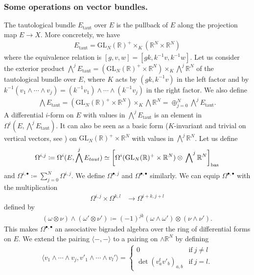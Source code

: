 \documentclass[a4paper,11pt]{amsart} %
\newcommand{\8}{\infty}
\newcommand{\bas}{\mathrm{bas}}
\newcommand{\GL}{\mathrm{GL}}
\newcommand{\R}{\mathbb{R}}
\newcommand{\taut}{\textrm{taut}}
\theoremstyle{mytheoremstyle}
\theoremstyle{remark}
\numberwithin{equation}{section}
\begin{document}
\subsubsection{Some operations on vector bundles.} The tautological bundle $E_ {\taut}$ over $E$ is the pullback of $E$ along the projection map $E \rightarrow X$. More concretely, we have 
\begin{align}
E_ {\taut}=\GL_N(\R)^+ \times_K (\R^{N} \times \R^{N})
\end{align} where the equivalence relation is $[g,v,w]=[gk,k^{-1}v,k^{-1}w]$. Let us consider the exterior product $\bigwedge^jE_{\taut}=(\GL_N(\R)^+ \times \R^{N}) \times_K \bigwedge^j \R^{N}$ of the tautological bundle over $E$, where $K$ acts by $(gk,k^{-1}v)$ in the left factor and by $k^{-1}(v_1 \wedge \cdots \wedge v_j)=(k^{-1}v_1) \wedge \cdots \wedge (k^{-1}v_j)$ in the right factor. We also define 
\begin{align}
\bigwedge E_{\taut}=(\GL_N(\R)^+ \times \R^{N}) \times_K \bigwedge \R^{N} = \oplus_{j=0}^N \bigwedge^jE_{\taut}.
\end{align} A differential $i$-form on $E$ with values in  $\bigwedge^j E_{\taut}$ is an element in $\Omega^i(E,\bigwedge^j E_{\taut})$. It can also be seen as  a basic form ($K$-invariant and trivial on vertical vectors, see \cite[Proposition~1.9]{berline}) on $\GL_N(\R)^+ \times \R^{N}$ with values in $\bigwedge^j \R^N$. 
Let us define
\begin{align}
    \Omega^{i,j} \coloneqq\Omega^i(E,\bigwedge^j E_{\taut}) \simeq \left [ \Omega^i(\GL_N(\R)^+ \times \R^{N}) \otimes  \sideset{}{^{j}}\bigwedge \R^{N} \right ]_{\bas}
\end{align}
and $\Omega^{i,\bullet} \coloneqq \sum_{j=0}^N \Omega^{i,j}$. We define $\Omega^{\bullet,j}$ and $\Omega^{\bullet,\bullet}$ similarly. We can equip $\Omega^{\bullet,\bullet}$ with the multiplication
\begin{align}
   \Omega^{i,j} \times \Omega^{k,l} & \longrightarrow \Omega^{i+k,j+l}
\end{align}
defined by
\begin{align}
 (\omega \otimes \nu) \wedge (\omega' \otimes \nu') \coloneqq (-1)^{jk}(\omega \wedge \omega') \otimes (\nu \wedge \nu').
\end{align}
This makes $\Omega^{\bullet,\bullet}$ an associative bigraded algebra over the ring of differential forms on $E$. We extend the pairing $\langle-,-\rangle$ to a pairing on $\wedge \R^{N}$ by defining
\begin{align}
    \langle v_1\wedge \cdots \wedge v_j,v'_1 \wedge \cdots \wedge v_l' \rangle= \begin{cases}
        0 & \textrm{if} \ j \neq l \\
        \det(v_a^tv'_b)_{a,b} & \textrm{if} \ j=l.
    \end{cases}
\end{align}
\end{document}
